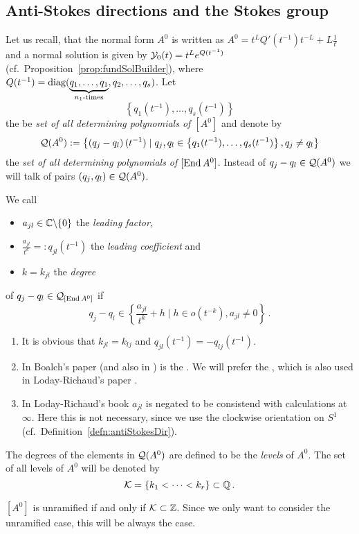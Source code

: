 \subsection{Anti-Stokes directions and the Stokes group}
Let us recall, that the normal form $A^0$ is written as
$A^0=t^LQ'(t^{-1})t^{-L}+L\frac{1}{t}$ and a normal solution is given by
$\mathcal{Y}_0(t)=t^Le^{Q(t^{-1})}$ (cf.\ Proposition~\ref{prop:fundSolBuilder}), where
$Q(t^{-1})=\diag(\underset{n_1\text{-times}}{\underbrace{%
  q_1,\dots,q_1}},q_2,\dots ,q_s)$.
Let
\[
  \left\{q_1(t^{-1}),\dots,q_s(t^{-1})\right\}
\]
the be \emph{set of all determining polynomials of $[A^0]$} and denote by
\[
  \mathcal{Q}(A^0):=\left\{\left(q_j-q_l\right)(t^{-1})
    \mid
    q_j,q_l\in\left\{q_1(t^{-1}),\dots,q_s(t^{-1})\right\},
    q_j \neq q_l
  \right\}
\]
the \emph{set of all determining polynomials of $[\operatorname{End} A^0]$}.
Instead of $q_j-q_l\in\mathcal{Q}(A^0)$ we will talk of pairs $(q_j,q_l)\in\mathcal{Q}(A^0)$.
\begin{defn}\label{defn:determiningPolysOfEndA}
  We call
  \begin{itemize}
    \item $a_{jl}\in\mathbb{C}\backslash\{0\}$ the \emph{leading factor},
    \item $\frac{a_{jl}}{t^{k}}=:q_{jl}(t^{-1})$ the \emph{leading
      coefficient} and
    \item $k=k_{jl}$ the \emph{degree}
  \end{itemize}
  of $q_j-q_l\in\mathcal{Q}_{[\operatorname{End} A^0]}$ if
  \[
    q_j-q_l\in\left\{\frac{a_{jl}}{t^{k}}+h \mid h \in o(t^{-k}), a_{jl}\neq0
    \right\}\,.
  \]
  \begin{s-rem}
    \begin{enumerate}
      \item It is obvious that $k_{jl}=k_{lj}$ and
        $q_{jl}(t^{-1})=-q_{lj}(t^{-1})$.
      \item In Boalch's paper \cite{boalch} (and also in \cite{thboalch}) is
        the .
        We will prefer the , which is also used in
        Loday-Richaud's paper \cite{Loday1994}.
      \item In Loday-Richaud's book \cite[Def.4.3.6]{Loday2014} $a_{jl}$ is
        negated to be consistend with calculations at $\infty$.
        Here this is not necessary, since we use the clockwise orientation on
        $S^1$ (cf.\ Definition~\ref{defn:antiStokesDir}).
    \end{enumerate}
  \end{s-rem}
  The degrees of the elements in $\mathcal{Q}(A^0)$ are defined to be  the
  \emph{levels} of $A^0$.
  The set of all levels of $A^0$ will be denoted by
  \[
    \mathcal{K}=\{k_1<\dots<k_r\} \subset \mathbb{Q} \,.
  \]
  \begin{s-rem}
    $[A^0]$ is unramified if and only if $\mathcal{K}\subset\mathbb{Z}$. Since we only want to
    consider the unramified case, this will be always the case.
  \end{s-rem}
\end{defn}

